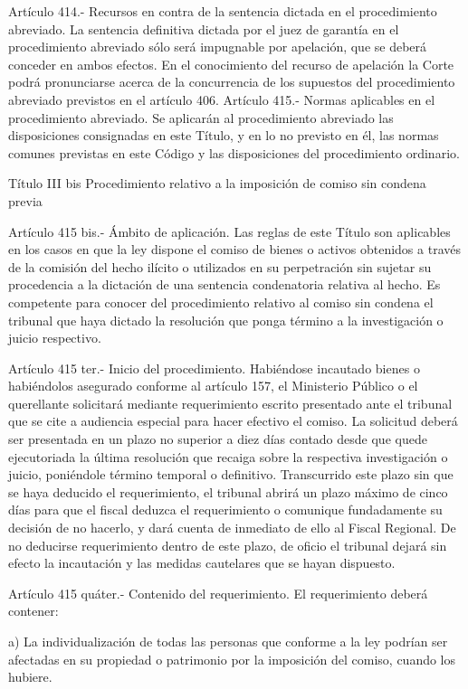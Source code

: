     Artículo 414.- Recursos en contra de la sentencia dictada en el procedimiento abreviado. La sentencia definitiva dictada por el juez de garantía en el procedimiento abreviado sólo será impugnable por apelación, que se deberá conceder en ambos efectos.
    En el conocimiento del recurso de apelación la Corte podrá pronunciarse acerca de la concurrencia de los supuestos del procedimiento abreviado previstos en el artículo 406.
    Artículo 415.- Normas aplicables en el procedimiento abreviado. Se aplicarán al procedimiento abreviado las disposiciones consignadas en este Título, y en lo no previsto en él, las normas comunes previstas en este Código y las disposiciones del procedimiento ordinario.

    Título III bis
    Procedimiento relativo a la imposición de comiso sin condena previa


    Artículo 415 bis.- Ámbito de aplicación. Las reglas de este Título son aplicables en los casos en que la ley dispone el comiso de bienes o activos obtenidos a través de la comisión del hecho ilícito o utilizados en su perpetración sin sujetar su procedencia a la dictación de una sentencia condenatoria relativa al hecho.
    Es competente para conocer del procedimiento relativo al comiso sin condena el tribunal que haya dictado la resolución que ponga término a la investigación o juicio respectivo.

    Artículo 415 ter.- Inicio del procedimiento. Habiéndose incautado bienes o habiéndolos asegurado conforme al artículo 157, el Ministerio Público o el querellante solicitará mediante requerimiento escrito presentado ante el tribunal que se cite a audiencia especial para hacer efectivo el comiso. La solicitud deberá ser presentada en un plazo no superior a diez días contado desde que quede ejecutoriada la última resolución que recaiga sobre la respectiva investigación o juicio, poniéndole término temporal o definitivo.
    Transcurrido este plazo sin que se haya deducido el requerimiento, el tribunal abrirá un plazo máximo de cinco días para que el fiscal deduzca el requerimiento o comunique fundadamente su decisión de no hacerlo, y dará cuenta de inmediato de ello al Fiscal Regional. De no deducirse requerimiento dentro de este plazo, de oficio el tribunal dejará sin efecto la incautación y las medidas cautelares que se hayan dispuesto.

    Artículo 415 quáter.- Contenido del requerimiento. El requerimiento deberá contener:

    a) La individualización de todas las personas que conforme a la ley podrían ser afectadas en su propiedad o patrimonio por la imposición del comiso, cuando los hubiere.

